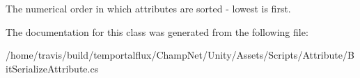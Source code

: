 The numerical order in which attributes are sorted -\/ lowest is first. 



The documentation for this class was generated from the following file\-:\begin{DoxyCompactItemize}
\item 
/home/travis/build/temportalflux/\-Champ\-Net/\-Unity/\-Assets/\-Scripts/\-Attribute/Bit\-Serialize\-Attribute.\-cs\end{DoxyCompactItemize}
